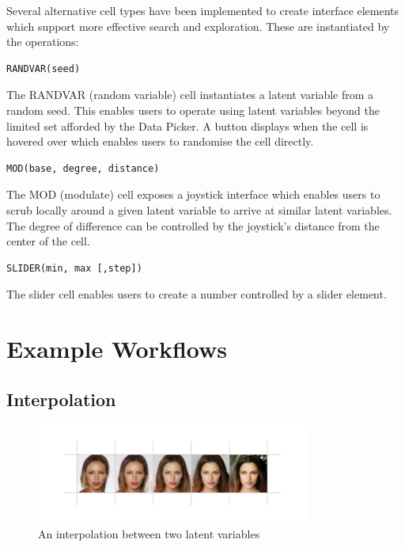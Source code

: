 \documentclass[letterpaper]{article}
\begin{document}
Several alternative cell types have been implemented to create interface elements which support more effective search and exploration. These are instantiated by the operations:

\begin{verbatim}
RANDVAR(seed)
\end{verbatim}
The RANDVAR (random variable) cell instantiates a latent variable from a random seed. This enables users to operate using latent variables beyond the limited set afforded by the Data Picker. A button displays when the cell is hovered over which enables users to randomise the cell directly.

\begin{verbatim}
MOD(base, degree, distance)
\end{verbatim}
The MOD (modulate) cell exposes a joystick interface which enables users to scrub locally around a given latent variable to arrive at similar latent variables. The degree of difference can be controlled by the joystick’s distance from the center of the cell.

\begin{verbatim}
SLIDER(min, max [,step])
\end{verbatim}
The slider cell enables users to create a number controlled by a slider element.

\newpage 
\section*{Example Workflows}

\setcounter{secnumdepth}{0}

\subsection{Interpolation}
\begin{figure}[ht!]
  \centering
  \includegraphics[width=9cm]{figs/04-interpolation-strip.jpg}
  \caption{An interpolation between two latent variables}
\end{figure}
\end{document}
